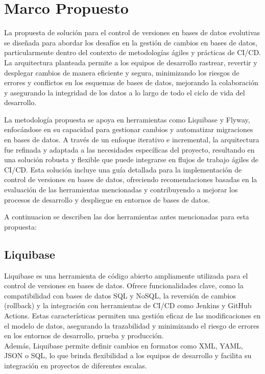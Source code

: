 \documentclass{IEEEtran}
\begin{document}
\section{Marco Propuesto}
La propuesta de solución para el control de versiones en bases de datos evolutivas se diseñada para abordar los desafíos en la gestión de cambios en bases de datos, particularmente dentro del contexto de metodologías ágiles y prácticas de CI/CD. La arquitectura planteada permite a los equipos de desarrollo rastrear, revertir y desplegar cambios de manera eficiente y segura, minimizando los riesgos de errores y conflictos en los esquemas de bases de datos, mejorando la colaboración y asegurando la integridad de los datos a lo largo de todo el ciclo de vida del desarrollo.

La metodología propuesta se apoya en herramientas como Liquibase y Flyway, enfocándose en su capacidad para gestionar cambios y automatizar migraciones en bases de datos. A través de un enfoque iterativo e incremental, la arquitectura fue refinada y adaptada a las necesidades específicas del proyecto, resultando en una solución robusta y flexible que puede integrarse en flujos de trabajo ágiles de CI/CD. Esta solución incluye una guía detallada para la implementación de control de versiones en bases de datos, ofreciendo recomendaciones basadas en la evaluación de las herramientas mencionadas y contribuyendo a mejorar los procesos de desarrollo y despliegue en entornos de bases de datos.

A continuacion se describen las dos herramientas antes mencionadas para esta propuesta:
\subsection{Liquibase}
Liquibase es una herramienta de código abierto ampliamente utilizada para el control de versiones en bases de datos. Ofrece funcionalidades clave, como la compatibilidad con bases de datos SQL y NoSQL, la reversión de cambios (rollback) y la integración con herramientas de CI/CD como Jenkins y GitHub Actions. Estas características permiten una gestión eficaz de las modificaciones en el modelo de datos, asegurando la trazabilidad y minimizando el riesgo de errores en los entornos de desarrollo, prueba y producción.\\ Además, Liquibase permite definir cambios en formatos como XML, YAML, JSON o SQL, lo que brinda flexibilidad a los equipos de desarrollo y facilita su integración en proyectos de diferentes escalas.
\end{document}
